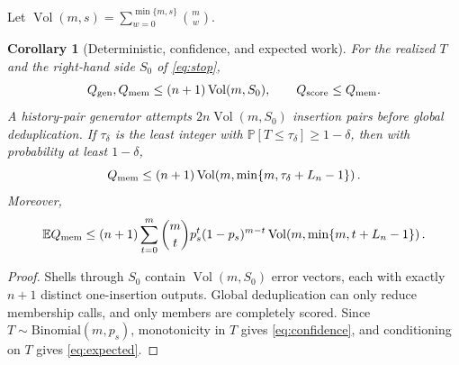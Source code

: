 \documentclass[11pt]{article}
\newtheorem{corollary}[theorem]{Corollary}
\theoremstyle{remark}\newtheorem{remark}[theorem]{Remark}
\newcommand{\Prb}{\mathbb P}\newcommand{\ML}{\operatorname{ML}}
\newcommand{\Vol}{\operatorname{Vol}}\newcommand{\wt}{\operatorname{wt}}
\begin{document}
Let $\Vol(m,s)=\sum_{w=0}^{\min\{m,s\}}\binom mw$.
\begin{corollary}[Deterministic, confidence, and expected work]\label{cor:work}
For the realized $T$ and the right-hand side $S_0$ of \eqref{eq:stop},
\begin{equation}
 Q_{\rm gen},Q_{\rm mem}\le(n+1)\Vol(m,S_0),\qquad Q_{\rm score}\le Q_{\rm mem}. \label{eq:work}
\end{equation}
A history-pair generator attempts $2n\Vol(m,S_0)$ insertion pairs before global deduplication.
If $\tau_\delta$ is the least integer with $\Prb[T\le\tau_\delta]\ge1-\delta$, then with
probability at least $1-\delta$,
\begin{equation}
 Q_{\rm mem}\le(n+1)\Vol\!\left(m,\min\{m,\tau_\delta+L_n-1\}\right). \label{eq:confidence}
\end{equation}
Moreover,
\begin{equation}
 \mathbb E Q_{\rm mem}\le(n+1)\sum_{t=0}^{m}\binom mtp_s^t(1-p_s)^{m-t}
 \Vol\!\left(m,\min\{m,t+L_n-1\}\right). \label{eq:expected}
\end{equation}
\end{corollary}
\begin{proof}
Shells through $S_0$ contain $\Vol(m,S_0)$ error vectors, each with exactly $n+1$ distinct
one-insertion outputs. Global deduplication can only reduce membership calls, and only members are
completely scored. Since $T\sim\mathrm{Binomial}(m,p_s)$, monotonicity in $T$ gives
\eqref{eq:confidence}, and conditioning on $T$ gives \eqref{eq:expected}.
\end{proof}
\end{document}
